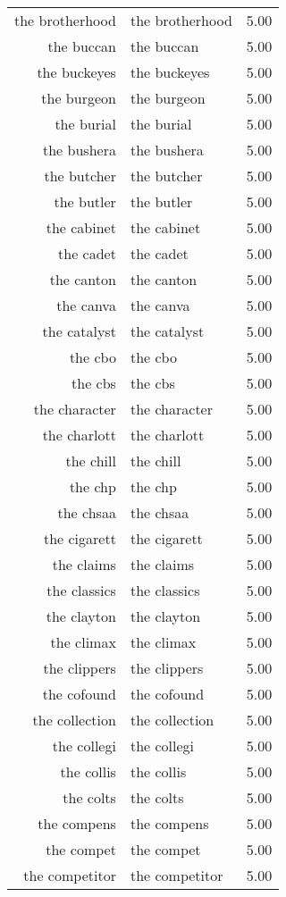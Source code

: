 \begin{table}[ht]
\begin{tabular}{rlr}
  the brotherhood & the brotherhood & 5.00 \\ 
  the buccan & the buccan & 5.00 \\ 
  the buckeyes & the buckeyes & 5.00 \\ 
  the burgeon & the burgeon & 5.00 \\ 
  the burial & the burial & 5.00 \\ 
  the bushera & the bushera & 5.00 \\ 
  the butcher & the butcher & 5.00 \\ 
  the butler & the butler & 5.00 \\ 
  the cabinet & the cabinet & 5.00 \\ 
  the cadet & the cadet & 5.00 \\ 
  the canton & the canton & 5.00 \\ 
  the canva & the canva & 5.00 \\ 
  the catalyst & the catalyst & 5.00 \\ 
  the cbo & the cbo & 5.00 \\ 
  the cbs & the cbs & 5.00 \\ 
  the character & the character & 5.00 \\ 
  the charlott & the charlott & 5.00 \\ 
  the chill & the chill & 5.00 \\ 
  the chp & the chp & 5.00 \\ 
  the chsaa & the chsaa & 5.00 \\ 
  the cigarett & the cigarett & 5.00 \\ 
  the claims & the claims & 5.00 \\ 
  the classics & the classics & 5.00 \\ 
  the clayton & the clayton & 5.00 \\ 
  the climax & the climax & 5.00 \\ 
  the clippers & the clippers & 5.00 \\ 
  the cofound & the cofound & 5.00 \\ 
  the collection & the collection & 5.00 \\ 
  the collegi & the collegi & 5.00 \\ 
  the collis & the collis & 5.00 \\ 
  the colts & the colts & 5.00 \\ 
  the compens & the compens & 5.00 \\ 
  the compet & the compet & 5.00 \\ 
  the competitor & the competitor & 5.00 \\ 

\end{tabular}
\end{table}
